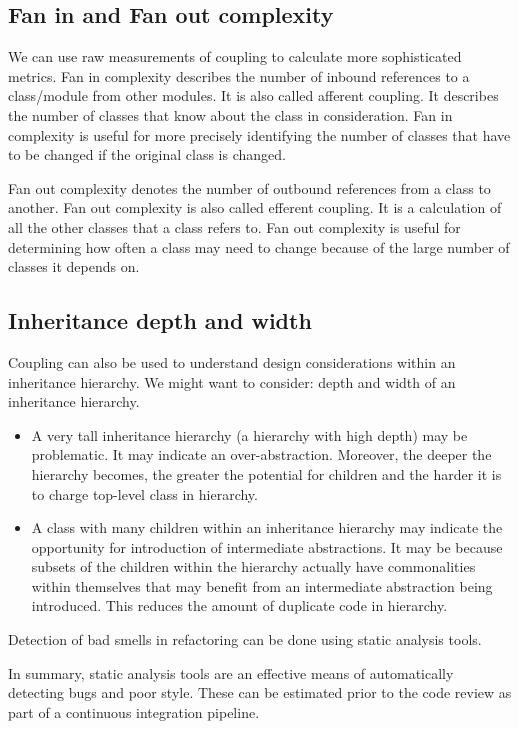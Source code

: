 \documentclass[a4paper, openany]{memoir}
\begin{document}
\subsection{Fan in and Fan out complexity}
We can use raw measurements of coupling to calculate more sophisticated metrics. Fan in complexity describes the number of inbound references to a class/module from other modules. It is also called afferent coupling. It describes the number of classes that know about the class in consideration. Fan in complexity is useful for more precisely identifying the number of classes that have to be changed if the original class is changed.

Fan out complexity denotes the number of outbound references from a class to another. Fan out complexity is also called efferent coupling. It is a calculation of all the other classes that a class refers to. Fan out complexity is useful for determining how often a class may need to change because of the large number of classes it depends on.

\subsection{Inheritance depth and width}
Coupling can also be used to understand design considerations within an inheritance hierarchy. We might want to consider: depth and width of an inheritance hierarchy.
\begin{itemize}
    \item A very tall inheritance hierarchy (a hierarchy with high depth) may be problematic. It may indicate an over-abstraction. Moreover, the deeper the hierarchy becomes, the greater the potential for children and the harder it is to charge top-level class in hierarchy.
    
    \item A class with many children within an inheritance hierarchy may indicate the opportunity for introduction of intermediate abstractions. It may be because subsets of the children within the hierarchy actually have commonalities within themselves that may benefit from an intermediate abstraction being introduced. This reduces the amount of duplicate code in hierarchy.
\end{itemize}
Detection of bad smells in refactoring can be done using static analysis tools.

In summary, static analysis tools are an effective means of automatically detecting bugs and poor style. These can be estimated prior to the code review as part of a continuous integration pipeline.
\end{document}
